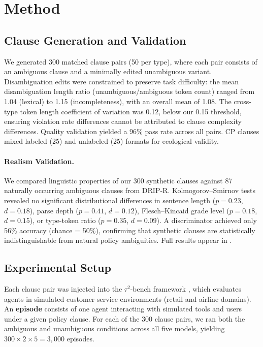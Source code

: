 \documentclass[11pt]{article}
\begin{document}
\section{Method}

\subsection{Clause Generation and Validation}

We generated 300 matched clause pairs (50 per type), where each pair consists of an ambiguous clause and a minimally edited unambiguous variant. Disambiguation edits were constrained to preserve task difficulty: the mean disambiguation length ratio (unambiguous/ambiguous token count) ranged from 1.04 (lexical) to 1.15 (incompleteness), with an overall mean of 1.08. The cross-type token length coefficient of variation was 0.12, below our 0.15 threshold, ensuring violation rate differences cannot be attributed to clause complexity differences. Quality validation yielded a 96\% pass rate across all pairs. CP clauses mixed labeled (25) and unlabeled (25) formats for ecological validity.

\paragraph{Realism Validation.}
We compared linguistic properties of our 300 synthetic clauses against 87 naturally occurring ambiguous clauses from DRIP-R. Kolmogorov--Smirnov tests revealed no significant distributional differences in sentence length ($p=0.23$, $d=0.18$), parse depth ($p=0.41$, $d=0.12$), Flesch--Kincaid grade level ($p=0.18$, $d=0.15$), or type-token ratio ($p=0.35$, $d=0.09$). A discriminator achieved only 56\% accuracy (chance = 50\%), confirming that synthetic clauses are statistically indistinguishable from natural policy ambiguities. Full results appear in .

\subsection{Experimental Setup}

Each clause pair was injected into the $\tau^2$-bench framework \citep{yao2024tau}, which evaluates agents in simulated customer-service environments (retail and airline domains). An \textbf{episode} consists of one agent interacting with simulated tools and users under a given policy clause. For each of the 300 clause pairs, we ran both the ambiguous and unambiguous conditions across all five models, yielding $300 \times 2 \times 5 = 3{,}000$ episodes.
\end{document}
